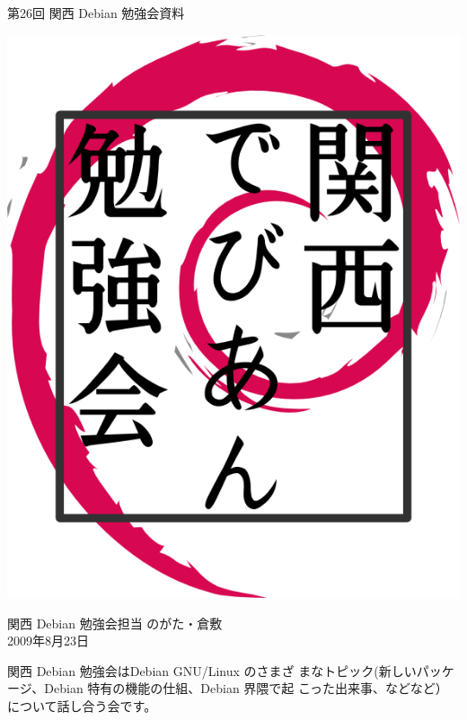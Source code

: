 \documentclass[mingoth,a4paper]{jsarticle}
\newcommand{\debmtgyear}{2009}
\newcommand{\debmtgdate}{23}
\newcommand{\debmtgmonth}{8}
\newcommand{\debmtgnumber}{26}
\begin{document}
\begin{titlepage}


 第\debmtgnumber{}回 関西 Debian 勉強会資料

\vspace{2cm}

\begin{center}
\includegraphics{image200802/kansaidebianlogo.png}
\end{center}

\begin{flushright}
\hfill{}関西 Debian 勉強会担当 のがた・倉敷\\
\hfill{}\debmtgyear{}年\debmtgmonth{}月\debmtgdate{}日
\end{flushright}

\thispagestyle{empty}
\end{titlepage}

 
 関西 Debian 勉強会はDebian GNU/Linux のさまざ
 まなトピック(新しいパッケージ、Debian 特有の機能の仕組、Debian 界隈で起
 こった出来事、などなど）について話し合う会です。
\end{document}
